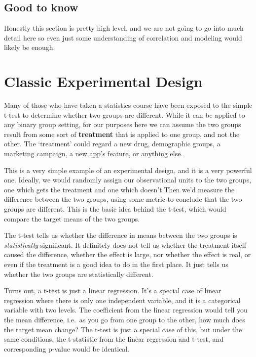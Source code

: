\documentclass[
  letterpaper,
]{krantz}
\begin{document}
\subsection{Good to know}\label{good-to-know-3}

Honestly this section is pretty high level, and we are not going to go
into much detail here so even just some understanding of correlation and
modeling would likely be enough.

\section{Classic Experimental Design}\label{classic-experimental-design}

Many of those who have taken a statistics course have been exposed to
the simple t-test to determine whether two groups are different. While
it can be applied to any binary group setting, for our purposes here we
can assume the two groups result from some sort of \textbf{treatment}
that is applied to one group, and not the other. The `treatment' could
regard a new drug, demographic groups, a marketing campaign, a new app's
feature, or anything else.

This is a very simple example of an experimental design, and it is a
very powerful one. Ideally, we would randomly assign our observational
units to the two groups, one which gets the treatment and one which
doesn't.Then we'd measure the difference between the two groups, using
some metric to conclude that the two groups are different. This is the
basic idea behind the t-test, which would compare the target means of
the two groups.

The t-test tells us whether the difference in means between the two
groups is \emph{statistically} significant. It definitely does not tell
us whether the treatment itself caused the difference, whether the
effect is large, nor whether the effect is real, or even if the
treatment is a good idea to do in the first place. It just tells us
whether the two groups are statistically different.

Turns out, a t-test is just a linear regression. It's a special case of
linear regression where there is only one independent variable, and it
is a categorical variable with two levels. The coefficient from the
linear regression would tell you the mean difference, i.e.~as you go
from one group to the other, how much does the target mean change? The
t-test is just a special case of this, but under the same conditions,
the t-statistic from the linear regression and t-test, and corresponding
p-value would be identical.
\end{document}
